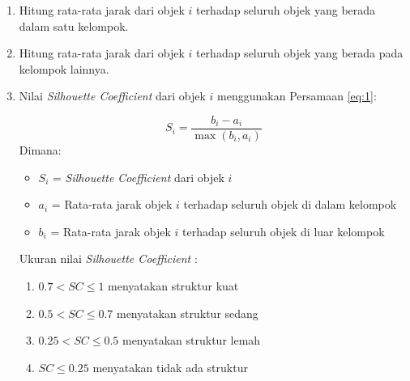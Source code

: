 \begin{enumerate}
	\item Hitung rata-rata jarak dari objek $i$ terhadap seluruh objek yang berada dalam satu kelompok.
	\item Hitung rata-rata jarak dari objek $i$ terhadap seluruh objek yang berada pada kelompok lainnya.
	\item Nilai \textit{Silhouette Coefficient} dari objek $i$ menggunakan Persamaan \ref{eq:1}:
	
	\begin{equation}\label{eq:1}
		S_i = \frac{b_i - a_i}{\max(b_i, a_i)}
	\end{equation}
	Dimana:
	\begin{itemize}
		\item $S_i$ = \textit{Silhouette Coefficient} dari objek $i$
		\item $a_i$ = Rata-rata jarak objek $i$ terhadap seluruh objek di dalam kelompok
		\item $b_i$ = Rata-rata jarak objek $i$ terhadap seluruh objek di luar kelompok
	\end{itemize}
	Ukuran nilai \textit{Silhouette Coefficient} \citep{Gentle1991}:
	\begin{enumerate}
		\item $0.7 < SC \le 1$ menyatakan struktur kuat
		\item $0.5 < SC \le 0.7$ menyatakan struktur sedang
		\item $0.25 < SC \le 0.5$ menyatakan struktur lemah
		\item $SC \le 0.25$ menyatakan tidak ada struktur
	\end{enumerate}
\end{enumerate}

